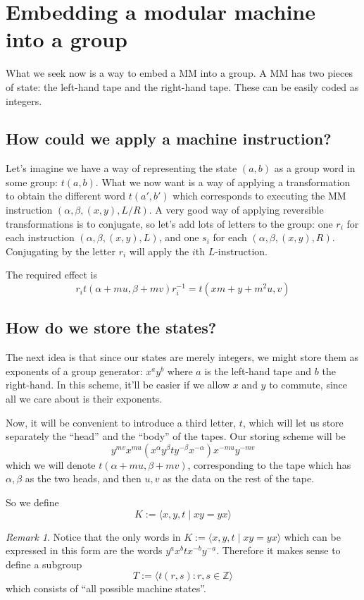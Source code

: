 \documentclass[11pt]{amsart}
\theoremstyle{remark}
\newtheorem*{remark}{Remark}
\begin{document}
\section{Embedding a modular machine into a group}

What we seek now is a way to embed a MM into a group.
A MM has two pieces of state: the left-hand tape and the right-hand tape.
These can be easily coded as integers.

\subsection{How could we apply a machine instruction?}
Let's imagine we have a way of representing the state $(a,b)$ as a group word in some group: $t(a, b)$.
What we now want is a way of applying a transformation to obtain the different word $t(a', b')$ which corresponds to
executing the MM instruction $(\alpha, \beta, (x, y), L/R)$.
A very good way of applying reversible transformations is to conjugate, so let's add lots of letters to the group:
one $r_i$ for each instruction $(\alpha, \beta, (x,y), L)$, and one $s_i$ for each $(\alpha, \beta, (x,y), R)$.
Conjugating by the letter $r_i$ will apply the $i$th $L$-instruction.

The required effect is $$r_i t(\alpha + m u, \beta + m v) r_i^{-1} = t(xm+y+m^2u, v)$$

\subsection{How do we store the states?}
The next idea is that since our states are merely integers, we might store them as exponents of a group generator:
$x^a y^b$ where $a$ is the left-hand tape and $b$ the right-hand.
In this scheme, it'll be easier if we allow $x$ and $y$ to commute, since all we care about is their exponents.

Now, it will be convenient to introduce a third letter, $t$, which will let us store separately the ``head'' and the ``body'' of the tapes.
Our storing scheme will be $$y^{m v} x^{mu} (x^{\alpha} y^{\beta} t y^{-\beta} x^{-\alpha}) x^{-m u} y^{-m v}$$
which we will denote $t(\alpha+m u, \beta+m v)$,
corresponding to the tape which has $\alpha, \beta$ as the two heads, and then $u, v$ as the data on the rest of the tape.

So we define $$K := \langle x, y, t \mid xy=yx \rangle$$

\begin{remark}
Notice that the only words in $K := \langle x, y, t \mid xy=yx \rangle$ which can be expressed in this form are the words $y^a x^b t x^{-b} y^{-a}$.
Therefore it makes sense to define a subgroup $$T := \langle t(r, s) : r, s \in \mathbb{Z} \rangle$$
which consists of ``all possible machine states''.
\end{remark}
\end{document}
